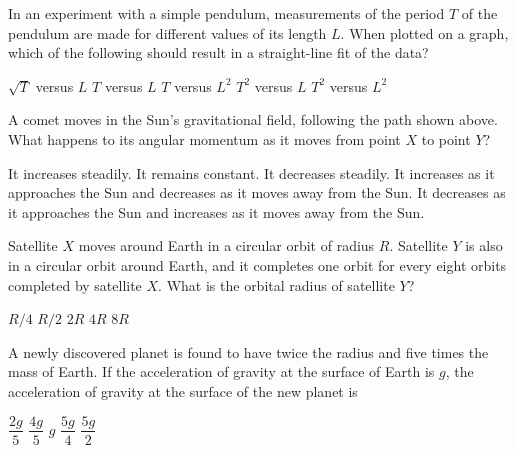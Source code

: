 \documentclass[12pt]{../../oss-classkick-exam}
\begin{document}
\begin{questions}
  \question In an experiment with a simple pendulum, measurements of the period
  $T$ of the pendulum are made for different values of its length $L$.
  When plotted on a graph, which of the following should result in a
  straight-line fit of the data?
  \begin{choices}
    \choice $\sqrt{T}$ versus $L$
    \choice $T$ versus $L$
    \choice $T$ versus $L^2$
    \choice $T^2$ versus $L$
    \choice $T^2$ versus $L^2$
  \end{choices}
  \newpage
  
  \vspace{-.3in} 
  \question A comet moves in the Sun's gravitational field, following the path
  shown above. What happens to its angular momentum as it moves from point $X$
  to point $Y$?
  \begin{choices}
    \choice It increases steadily.
    \choice It remains constant.
    \choice It decreases steadily.
    \choice It increases as it approaches the Sun and decreases as it moves
    away from the Sun.
    \choice It decreases as it approaches the Sun and increases as it moves
    away from the Sun.
  \end{choices}

  \question Satellite $X$ moves around Earth in a circular orbit of radius $R$.
  Satellite $Y$ is also in a circular orbit around Earth, and it completes one
  orbit for every eight orbits completed by satellite $X$. What is the
  orbital radius of satellite $Y$?
  \begin{choices}
    \choice $R/4$
    \choice $R/2$
    \choice $2R$
    \choice $4R$
    \choice $8R$
  \end{choices}
  
  \question A newly discovered planet is found to have twice the radius and five
  times the mass of Earth. If the acceleration of gravity at the surface of
  Earth is $g$, the acceleration of gravity at the surface of the new planet is
  \begin{choices}
    \choice $\dfrac{2g}5$
    \choice $\dfrac{4g}5$
    \choice $g$
    \choice $\dfrac{5g}4$
    \choice $\dfrac{5g}2$
  \end{choices}
  
  

\end{questions}
\end{document}
